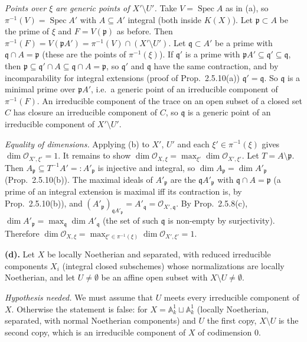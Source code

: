 \documentclass[11pt]{article}
\begin{document}
\emph{Points over $\xi$ are generic points of $X'\setminus U'$.} Take $V=\operatorname{Spec}A$ as in (a), so $\pi^{-1}(V)=\operatorname{Spec}A'$ with $A\subseteq A'$ integral (both inside $K(X)$). Let $\mathfrak p\subset A$ be the prime of $\xi$ and $F=V(\mathfrak p)$ as before. Then $\pi^{-1}(F)=V(\mathfrak pA')=\pi^{-1}(V)\cap(X'\setminus U')$. Let $\mathfrak q\subset A'$ be a prime with $\mathfrak q\cap A=\mathfrak p$ (these are the points of $\pi^{-1}(\xi)$). If $\mathfrak q'$ is a prime with $\mathfrak pA'\subseteq\mathfrak q'\subseteq\mathfrak q$, then $\mathfrak p\subseteq\mathfrak q'\cap A\subseteq\mathfrak q\cap A=\mathfrak p$, so $\mathfrak q'$ and $\mathfrak q$ have the same contraction, and by incomparability for integral extensions (proof of Prop.~2.5.10(a)) $\mathfrak q'=\mathfrak q$. So $\mathfrak q$ is a minimal prime over $\mathfrak pA'$, i.e.\ a generic point of an irreducible component of $\pi^{-1}(F)$. An irreducible component of the trace on an open subset of a closed set $C$ has closure an irreducible component of $C$, so $\mathfrak q$ is a generic point of an irreducible component of $X'\setminus U'$.

\emph{Equality of dimensions.} Applying (b) to $X'$, $U'$ and each $\xi'\in\pi^{-1}(\xi)$ gives $\dim\mathcal O_{X',\xi'}=1$. It remains to show $\dim\mathcal O_{X,\xi}=\max_{\xi'}\dim\mathcal O_{X',\xi'}$. Let $T=A\setminus\mathfrak p$. Then $A_{\mathfrak p}\subseteq T^{-1}A'=:A'_{\mathfrak p}$ is injective and integral, so $\dim A_{\mathfrak p}=\dim A'_{\mathfrak p}$ (Prop.~2.5.10(b)). The maximal ideals of $A'_{\mathfrak p}$ are the $\mathfrak qA'_{\mathfrak p}$ with $\mathfrak q\cap A=\mathfrak p$ (a prime of an integral extension is maximal iff its contraction is, by Prop.~2.5.10(b)), and $(A'_{\mathfrak p})_{\mathfrak qA'_{\mathfrak p}}=A'_{\mathfrak q}=\mathcal O_{X',\mathfrak q}$. By Prop.~2.5.8(c), $\dim A'_{\mathfrak p}=\max_{\mathfrak q}\dim A'_{\mathfrak q}$ (the set of such $\mathfrak q$ is non-empty by surjectivity). Therefore $\dim\mathcal O_{X,\xi}=\max_{\xi'\in\pi^{-1}(\xi)}\dim\mathcal O_{X',\xi'}=1$.

\textbf{(d).} Let $X$ be locally Noetherian and separated, with reduced irreducible components $X_i$ (integral closed subschemes) whose normalizations are locally Noetherian, and let $U\ne\emptyset$ be an affine open subset with $X\setminus U\neq\emptyset$.

\emph{Hypothesis needed.} We must assume that $U$ meets every irreducible component of $X$. Otherwise the statement is false: for $X=\mathbb A^1_k\sqcup\mathbb A^1_k$ (locally Noetherian, separated, with normal Noetherian components) and $U$ the first copy, $X\setminus U$ is the second copy, which is an irreducible component of $X$ of codimension $0$.
\end{document}
